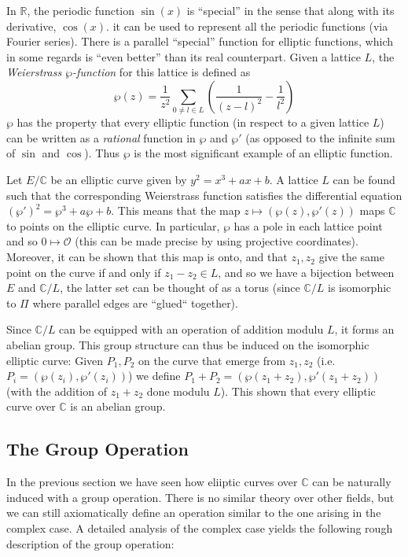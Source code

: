 \documentclass[11pt,english]{article}
\begin{document}
In $\mathbb{R}$, the periodic function $\sin(x)$ is ``special'' in the sense that along with its derivative, $\cos(x)$. it can be used to represent all
the periodic functions (via Fourier series). There is a parallel ``special'' function for elliptic functions, which in some regards is ``even better'' than its real counterpart. 
Given a lattice $L$, the \emph{Weierstrass $\wp$-function} for this lattice is defined as $$\wp(z)=\frac{1}{z^2}\sum_{0\ne l\in L}\left(\frac{1}{(z-l)^2}-\frac{1}{l^2}\right)$$
$\wp$ has the property that every elliptic function (in respect to a given lattice $L$) can be written as a \emph{rational} function in $\wp$ and $\wp'$ (as opposed to the
infinite sum of $\sin$ and $\cos$). Thus $\wp$ is the most significant example of an elliptic function.

Let $E/\mathbb{C}$ be an elliptic curve given by $y^2=x^3+ax+b$. A lattice $L$ can be found such that the corresponding Weierstrass function satisfies the differential equation
$(\wp')^2=\wp^3+a\wp+b$. This means that the map $z\mapsto (\wp(z),\wp'(z))$ maps $\mathbb{C}$ to points on the elliptic curve. In particular, $\wp$
has a pole in each lattice point and so $0\mapsto \mathcal{O}$ (this can be made precise by using projective coordinates). Moreover, it
can be shown that this map is onto, and that $z_1,z_2$ give the same point on the curve if and only if $z_1-z_2\in L$, and so we have a bijection
between $E$  and $\mathbb{C}/L$, the latter set can be thought of as a torus (since $\mathbb{C}/L$ is isomorphic to $\Pi$ where parallel edges are ``glued`` together).

Since $\mathbb{C}/L$ can be equipped with an operation of addition modulu $L$, it forms an abelian group. This group structure can thus be induced on the 
isomorphic elliptic curve: Given $P_1, P_2$ on the curve that emerge from $z_1,z_2$ (i.e. $P_i=(\wp(z_i),\wp'(z_i))$) we define $P_1+P_2=(\wp(z_1+z_2),\wp'(z_1+z_2))$ 
(with the addition of $z_1+z_2$ done modulu $L$). This shown that every elliptic curve over $\mathbb{C}$ is an abelian group.
\subsection{The Group Operation}
In the previous section we have seen how eliiptic curves over $\mathbb{C}$ can be naturally induced with a group operation. There is no similar theory over
other fields, but we can still axiomatically define an operation similar to the one arising in the complex case. A detailed analysis of the complex case yields
the following rough description of the group operation:
\end{document}
